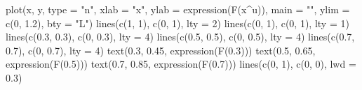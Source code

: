 \begin{Schunk}
\begin{Sinput}
 plot(x, y, type = "n", xlab = "x", ylab = expression(F(x^u)), main = "", ylim = c(0, 
      1.2), bty = "L")
 lines(c(1, 1), c(0, 1), lty = 2)
 lines(c(0, 1), c(0, 1), lty = 1)
 lines(c(0.3, 0.3), c(0, 0.3), lty = 4)
 lines(c(0.5, 0.5), c(0, 0.5), lty = 4)
 lines(c(0.7, 0.7), c(0, 0.7), lty = 4)
 text(0.3, 0.45, expression(F(0.3)))
 text(0.5, 0.65, expression(F(0.5)))
 text(0.7, 0.85, expression(F(0.7)))
 lines(c(0, 1), c(0, 0), lwd = 0.3)
\end{Sinput}
\end{Schunk}
